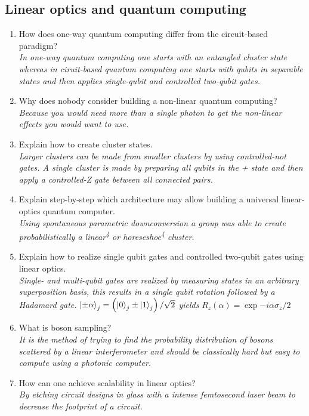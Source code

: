 \documentclass[a4paper]{scrartcl}
\newcommand{\qa}[2]{#1\\ \textit{#2}}
\begin{document}
\subsection*{Linear optics and quantum computing}
\begin{enumerate}[label=(\alph*)]
  \item \qa{How does one-way quantum computing differ from the circuit-based paradigm?}{In one-way quantum computing one starts with an entangled cluster state whereas in ciruit-based quantum computing one starts with qubits in separable states and then applies single-qubit and controlled two-qubit gates.}
  \item \qa{Why does nobody consider building a non-linear quantum computing?}{Because you would need more than a single photon to get the non-linear effects you would want to use.}
  \item \qa{Explain how to create cluster states.}{Larger clusters can be made from smaller clusters by using controlled-not gates. A single cluster is made by preparing all qubits in the + state and then apply a controlled-Z gate between all connected pairs.}
  \item \qa{Explain step-by-step which architecture may allow building a universal linear-optics quantum computer.}{Using spontaneous parametric downconversion a group was able to create probabilistically a linear\textsuperscript{4} or horeseshoe\textsuperscript{4} cluster.}
  \item \qa{Explain how to realize single qubit gates and controlled two-qubit gates using linear optics.}{Single- and multi-qubit gates are realized by measuring states in an arbitrary superposition basis, this results in a single qubit rotation followed by a Hadamard gate. } $\ket{\pm \alpha}_j = \left( \ket{0}_j \pm \ket{1}_j \right)/\sqrt{2}$ \textit{yields} $R_z(\alpha)=\exp{-i \alpha \sigma_z /2}$ \textit{}
  \item \qa{What is boson sampling?}{It is the method of trying to find the probability distribution of bosons scattered by a linear interferometer and should be classically hard but easy to compute using a photonic computer.}
  \item \qa{How can one achieve scalability in linear optics?}{By etching circuit designs in glass with a intense femtosecond laser beam to decrease the footprint of a circuit.}
\end{enumerate}
\end{document}
